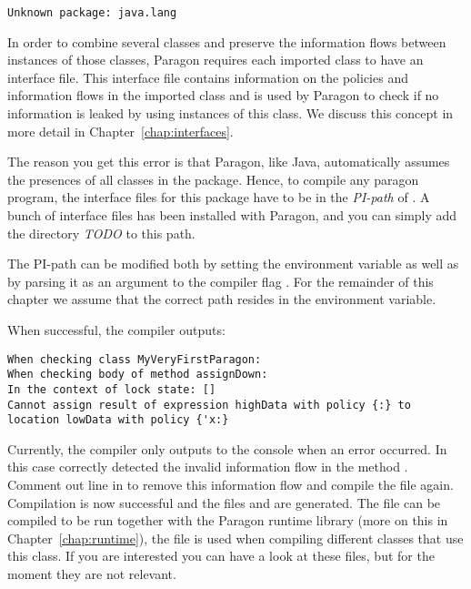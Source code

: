 \begin{lstlisting}
Unknown package: java.lang
\end{lstlisting}

In order to combine several classes and preserve the information flows between
instances of those classes, Paragon requires each imported class to have an
interface file. This interface file contains information on the policies and
information flows in the imported class and is used by Paragon to check if no
information is leaked by using instances of this class. We discuss this concept
in more detail in Chapter~\ref{chap:interfaces}. 

The reason you get this error is that Paragon, like Java, automatically assumes
the presences of all classes in the  package. Hence, to compile 
any paragon program, the interface files for this package have to be in the
\emph{PI-path} of . A bunch of interface files has been installed
with Paragon, and you can simply add the directory \emph{TODO} to this path.

The PI-path can be modified both by setting the environment variable 
as well as by parsing it as an argument to the compiler flag . For the
remainder of this chapter we assume that the correct path resides in the 
environment variable.

When successful, the compiler outputs:

\begin{lstlisting}
When checking class MyVeryFirstParagon:
When checking body of method assignDown:
In the context of lock state: []
Cannot assign result of expression highData with policy {:} to location lowData with policy {'x:}
\end{lstlisting}

Currently, the compiler only outputs to the console when an error occurred. In
this case  correctly detected the invalid information flow in the 
method . Comment out line  in 
to remove this information flow and compile the file again.
Compilation is now successful and the files  and
 are generated. The  file can be compiled
to be run together with the Paragon runtime library (more on this in 
Chapter~\ref{chap:runtime}), the  file is used when compiling different
classes that use this class. If you are interested you can have a look at these
files, but for the moment they are not relevant.

